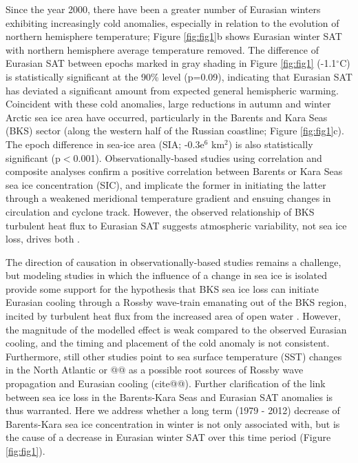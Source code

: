 \documentclass{nature}
\begin{document}
Since the year 2000, there have been a greater number of Eurasian winters exhibiting increasingly cold anomalies, especially in relation to the evolution of northern hemisphere temperature; Figure \ref{fig:fig1}b shows Eurasian winter SAT with northern hemisphere average temperature removed. The difference of Eurasian SAT between epochs marked in gray shading in Figure \ref{fig:fig1} (-1.1$^\circ$C) is statistically significant at the 90\% level (p=0.09), indicating that Eurasian SAT has deviated a significant amount from expected general hemispheric warming. Coincident with these cold anomalies, large reductions in autumn and winter Arctic sea ice area have occurred, particularly in the Barents and Kara Seas (BKS) sector (along the western half of the Russian coastline; Figure \ref{fig:fig1}c). The epoch difference in sea-ice area (SIA; -0.3e$^6$ km$^2$) is also statistically significant (p$<$0.001). Observationally-based studies using correlation and composite analyses confirm a positive correlation between Barents \cite{inoue12} or Kara \cite{outten12} Seas sea ice concentration (SIC), and implicate the former in initiating the latter through a weakened meridional temperature gradient and ensuing changes in circulation and cyclone track. However, the observed relationship of BKS turbulent heat flux to Eurasian SAT suggests atmospheric variability, not sea ice loss, drives both \cite{sorokina15}. 

The direction of causation in observationally-based studies remains a challenge, but modeling studies in which the influence of a change in sea ice is isolated provide some support for the hypothesis that BKS sea ice loss can initiate Eurasian cooling through a Rossby wave-train emanating out of the BKS region, incited by turbulent heat flux from the increased area of open water \cite{honda09,petoukhov10,mori14,kim14,peings14}. However, the magnitude of the modelled effect is weak compared to the observed Eurasian cooling, and the timing and placement of the cold anomaly is not consistent. Furthermore, still other studies point to sea surface temperature (SST) changes in the North Atlantic or @@ as a possible root sources of Rossby wave propagation and Eurasian cooling (cite@@). Further clarification of the link between sea ice loss in the Barents-Kara Seas and Eurasian SAT anomalies is thus warranted. Here we address whether a long term (1979 - 2012) decrease of Barents-Kara sea ice concentration in winter is not only associated with, but is the cause of a decrease in Eurasian winter SAT over this time period (Figure \ref{fig:fig1}). %
\end{document}
